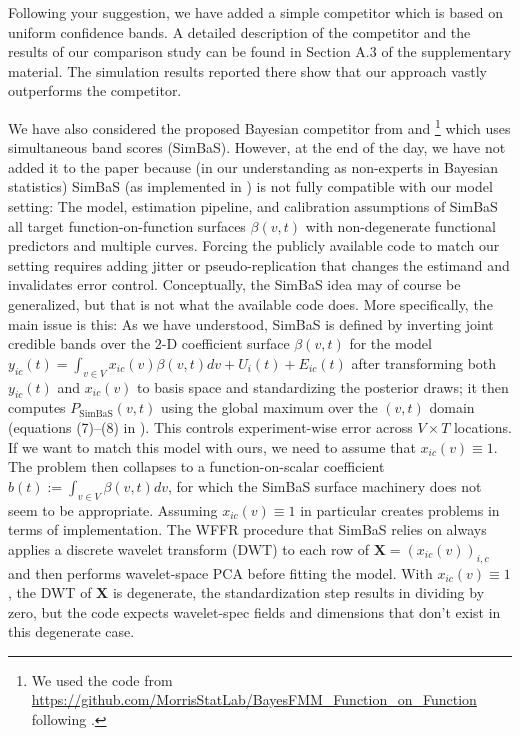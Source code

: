 \documentclass[a4paper,12pt]{article}
\begin{document}
\begin{enumerate}[label=\arabic*.,leftmargin=0.6cm]
Following your suggestion, we have added a simple competitor which is based on uniform confidence bands. A detailed description of the competitor and the results of our comparison study can be found in Section A.3 of the supplementary material. The simulation results reported there show that our approach vastly outperforms the competitor.

We have also considered the proposed Bayesian competitor from \cite{Meyer2015} and \cite{Zemplenyi2021}\footnote{We used the code from \url{https://github.com/MorrisStatLab/BayesFMM_Function_on_Function} following \cite{Zemplenyi2021}.} which uses simultaneous band scores (SimBaS). However, at the end of the day, we have not added it to the paper because (in our understanding as non-experts in Bayesian statistics) SimBaS (as implemented in \cite{Meyer2015}) is 
not fully compatible with our model setting: The model, estimation pipeline, and calibration assumptions of SimBaS all target function-on-function surfaces $\beta(v,t)$ with non-degenerate functional predictors and multiple curves. Forcing the publicly available code to match our setting requires adding jitter or pseudo-replication that changes the estimand and invalidates error control.
Conceptually, the SimBaS idea may of course be generalized, but that is not what the available code does. 
More specifically, the main issue is this: 
As we have understood, SimBaS is defined by inverting joint credible bands over the $2$-D coefficient surface $\beta(v,t)$ for the model $y_{ic}(t) = \int_{v\in V} x_{ic}(v)\beta(v, t)dv + U_i(t) +E_{ic}(t)$ after transforming both $y_{ic}(t)$ and $x_{ic}(v)$ to basis space and standardizing the posterior draws; it then computes $P_{\text{SimBaS}}(v,t)$ using the global maximum over the $(v,t)$ domain (equations (7)--(8) in \cite{Zemplenyi2021}). This controls experiment-wise error across $V\times T$ locations. 
If we want to match this model with ours, we need to assume that $x_{ic}(v) \equiv 1$. 
The problem then collapses to a function-on-scalar coefficient $b(t) := \int_{v\in V} \beta(v, t)dv$, for which the SimBaS surface machinery does not seem to be appropriate. Assuming $x_{ic}(v) \equiv 1$ in particular creates problems in terms of implementation. The WFFR procedure that SimBaS relies on always applies a discrete wavelet transform (DWT) to each row of $\mathbf{X} = \left(x_{ic}(v)\right)_{i, c}$ and then performs wavelet-space PCA before fitting the model. With $x_{ic}(v)\equiv 1$, the DWT of $\mathbf{X}$ is degenerate, the standardization step results in dividing by zero, but the code expects wavelet-spec fields and dimensions that don’t exist in this degenerate case. 

\end{enumerate}
\end{document}
